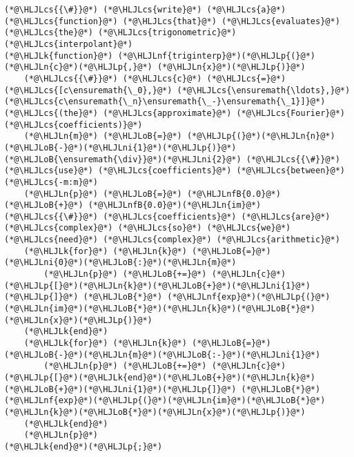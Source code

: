 \documentclass[12pt,a4paper]{article}
\newcommand{\HLJLk}[1]{\textcolor[RGB]{148,91,176}{\textbf{#1}}}
\newcommand{\HLJLn}[1]{#1}
\newcommand{\HLJLnf}[1]{\textcolor[RGB]{66,102,213}{#1}}
\newcommand{\HLJLnfB}[1]{\textcolor[RGB]{59,151,46}{#1}}
\newcommand{\HLJLni}[1]{\textcolor[RGB]{59,151,46}{#1}}
\newcommand{\HLJLoB}[1]{\textcolor[RGB]{102,102,102}{\textbf{#1}}}
\newcommand{\HLJLp}[1]{#1}
\newcommand{\HLJLcs}[1]{\textcolor[RGB]{153,153,119}{\textit{#1}}}
\begin{document}
\begin{lstlisting}
(*@\HLJLcs{{\#}}@*) (*@\HLJLcs{write}@*) (*@\HLJLcs{a}@*) (*@\HLJLcs{function}@*) (*@\HLJLcs{that}@*) (*@\HLJLcs{evaluates}@*) (*@\HLJLcs{the}@*) (*@\HLJLcs{trigonometric}@*) (*@\HLJLcs{interpolant}@*)
(*@\HLJLk{function}@*) (*@\HLJLnf{triginterp}@*)(*@\HLJLp{(}@*)(*@\HLJLn{c}@*)(*@\HLJLp{,}@*) (*@\HLJLn{x}@*)(*@\HLJLp{)}@*)
    (*@\HLJLcs{{\#}}@*) (*@\HLJLcs{c}@*) (*@\HLJLcs{=}@*) (*@\HLJLcs{[c\ensuremath{\_0},}@*) (*@\HLJLcs{\ensuremath{\ldots},}@*) (*@\HLJLcs{c\ensuremath{\_n}\ensuremath{\_-}\ensuremath{\_1}]}@*) (*@\HLJLcs{(the}@*) (*@\HLJLcs{approximate}@*) (*@\HLJLcs{Fourier}@*) (*@\HLJLcs{coefficients)}@*)
    (*@\HLJLn{m}@*) (*@\HLJLoB{=}@*) (*@\HLJLp{(}@*)(*@\HLJLn{n}@*)(*@\HLJLoB{-}@*)(*@\HLJLni{1}@*)(*@\HLJLp{)}@*)(*@\HLJLoB{\ensuremath{\div}}@*)(*@\HLJLni{2}@*) (*@\HLJLcs{{\#}}@*) (*@\HLJLcs{use}@*) (*@\HLJLcs{coefficients}@*) (*@\HLJLcs{between}@*) (*@\HLJLcs{-m:m}@*)
    (*@\HLJLn{p}@*) (*@\HLJLoB{=}@*) (*@\HLJLnfB{0.0}@*) (*@\HLJLoB{+}@*) (*@\HLJLnfB{0.0}@*)(*@\HLJLn{im}@*) (*@\HLJLcs{{\#}}@*) (*@\HLJLcs{coefficients}@*) (*@\HLJLcs{are}@*) (*@\HLJLcs{complex}@*) (*@\HLJLcs{so}@*) (*@\HLJLcs{we}@*) (*@\HLJLcs{need}@*) (*@\HLJLcs{complex}@*) (*@\HLJLcs{arithmetic}@*)
    (*@\HLJLk{for}@*) (*@\HLJLn{k}@*) (*@\HLJLoB{=}@*) (*@\HLJLni{0}@*)(*@\HLJLoB{:}@*)(*@\HLJLn{m}@*)
        (*@\HLJLn{p}@*) (*@\HLJLoB{+=}@*) (*@\HLJLn{c}@*)(*@\HLJLp{[}@*)(*@\HLJLn{k}@*)(*@\HLJLoB{+}@*)(*@\HLJLni{1}@*)(*@\HLJLp{]}@*) (*@\HLJLoB{*}@*) (*@\HLJLnf{exp}@*)(*@\HLJLp{(}@*)(*@\HLJLn{im}@*)(*@\HLJLoB{*}@*)(*@\HLJLn{k}@*)(*@\HLJLoB{*}@*)(*@\HLJLn{x}@*)(*@\HLJLp{)}@*)
    (*@\HLJLk{end}@*)
    (*@\HLJLk{for}@*) (*@\HLJLn{k}@*) (*@\HLJLoB{=}@*) (*@\HLJLoB{-}@*)(*@\HLJLn{m}@*)(*@\HLJLoB{:-}@*)(*@\HLJLni{1}@*)
        (*@\HLJLn{p}@*) (*@\HLJLoB{+=}@*) (*@\HLJLn{c}@*)(*@\HLJLp{[}@*)(*@\HLJLk{end}@*)(*@\HLJLoB{+}@*)(*@\HLJLn{k}@*)(*@\HLJLoB{+}@*)(*@\HLJLni{1}@*)(*@\HLJLp{]}@*) (*@\HLJLoB{*}@*) (*@\HLJLnf{exp}@*)(*@\HLJLp{(}@*)(*@\HLJLn{im}@*)(*@\HLJLoB{*}@*)(*@\HLJLn{k}@*)(*@\HLJLoB{*}@*)(*@\HLJLn{x}@*)(*@\HLJLp{)}@*)
    (*@\HLJLk{end}@*)
    (*@\HLJLn{p}@*)
(*@\HLJLk{end}@*)(*@\HLJLp{;}@*)
\end{lstlisting}
\end{document}
